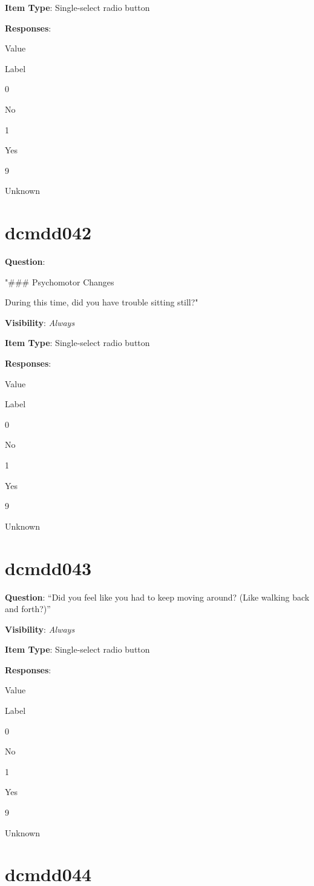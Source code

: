 \documentclass[
]{book}
\begin{document}
\textbf{Item Type}: Single-select radio button

\textbf{Responses}:

Value

Label

0

No

1

Yes

9

Unknown

\hypertarget{dcmdd042}{%
\section{dcmdd042}\label{dcmdd042}}

\textbf{Question}:

"\#\#\# Psychomotor Changes

During this time, did you have trouble sitting still?"

\textbf{Visibility}: \emph{Always}

\textbf{Item Type}: Single-select radio button

\textbf{Responses}:

Value

Label

0

No

1

Yes

9

Unknown

\hypertarget{dcmdd043}{%
\section{dcmdd043}\label{dcmdd043}}

\textbf{Question}: ``Did you feel like you had to keep moving around? (Like walking back and forth?)''

\textbf{Visibility}: \emph{Always}

\textbf{Item Type}: Single-select radio button

\textbf{Responses}:

Value

Label

0

No

1

Yes

9

Unknown

\hypertarget{dcmdd044}{%
\section{dcmdd044}\label{dcmdd044}}
\end{document}
